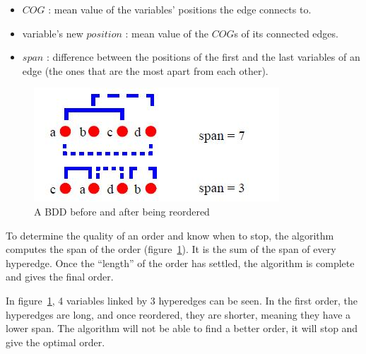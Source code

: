 \documentclass[12pt]{report}
\begin{document}
\begin{algorithm}[H]
\begin{algorithmic}[1]
  \Repeat
    \EndFor
    \EndFor
\EndFunction
\label{force}
\end{algorithmic}
\end{algorithm}

\begin{itemize}
  \item $COG$ : mean value of the variables' positions the edge connects to.
  \item variable's new $position$ : mean value of the $COG$s of its connected edges.
  \item $span$ : difference between the positions of the first and the last variables of an edge (the ones that are the most apart from each other).
\end{itemize}

\begin{figure}[!h]
  \centering
  \includegraphics[scale=0.7]{images/force_span.jpg}
  \caption{A BDD before and after being reordered}
  \label{force_span}
\end{figure}

To determine the quality of an order and know when to stop, the algorithm computes the span of the order (figure~\ref{force_span}). It is the sum of the span of every hyperedge. Once the \enquote{length} of the order has settled, the algorithm is complete and gives the final order.

In figure~\ref{force_span}, 4 variables linked by 3 hyperedges can be seen. In the first order, the hyperedges are long, and once reordered, they are shorter, meaning they have a lower span. The algorithm will not be able to find a better order, it will stop and give the optimal order.
\end{document}
